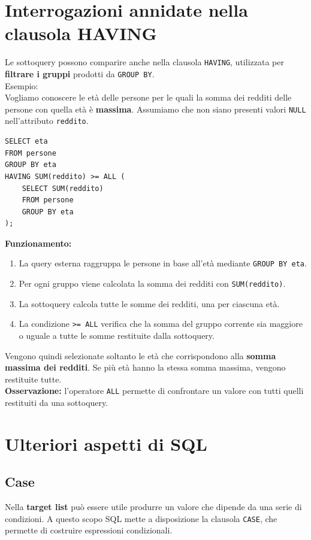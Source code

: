 \section{Interrogazioni annidate nella clausola HAVING}
Le sottoquery possono comparire anche nella
clausola \texttt{HAVING}, utilizzata per
\textbf{filtrare i gruppi} prodotti da
\texttt{GROUP BY}.\\
\textcolor{verdeEsempio}{Esempio: }\\
Vogliamo conoscere le età delle persone
per le quali la somma dei redditi delle persone
con quella età è \textbf{massima}.
Assumiamo che non siano presenti valori
\texttt{NULL} nell'attributo \texttt{reddito}.
\begin{verbatim}
SELECT eta
FROM persone
GROUP BY eta
HAVING SUM(reddito) >= ALL (
    SELECT SUM(reddito)
    FROM persone
    GROUP BY eta
);
\end{verbatim}
\textbf{Funzionamento:}
\begin{enumerate}
    \item La query esterna raggruppa le persone
    in base all'età mediante \texttt{GROUP BY eta}.

    \item Per ogni gruppo viene calcolata
    la somma dei redditi con \texttt{SUM(reddito)}.

    \item La sottoquery calcola tutte le somme
    dei redditi, una per ciascuna età.

    \item La condizione
    \texttt{>= ALL} verifica che la somma
    del gruppo corrente sia maggiore o uguale
    a tutte le somme restituite dalla sottoquery.
\end{enumerate}
Vengono quindi selezionate soltanto le età
che corrispondono alla \textbf{somma massima
dei redditi}.
Se più età hanno la stessa somma massima,
vengono restituite tutte.
\medskip\\
\noindent
\textbf{Osservazione:}
l'operatore \texttt{ALL} permette di confrontare
un valore con tutti quelli restituiti
da una sottoquery.
\section{Ulteriori aspetti di SQL}
\subsection{Case}
Nella \textbf{target list} può essere utile produrre un valore
che dipende da una serie di condizioni.
A questo scopo SQL mette a disposizione la clausola
\texttt{CASE}, che permette di costruire espressioni condizionali.
